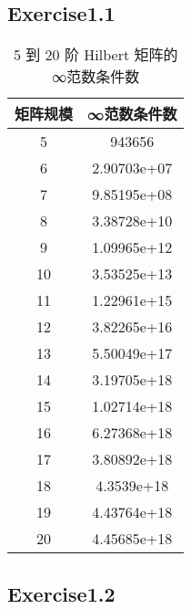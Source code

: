 \documentclass{article}
\begin{document}
\subsection*{Exercise1.1}


\begin{table}[htbp]
	\centering
	\begin{tabular}{cc}
		\toprule
		\textbf{矩阵规模} & \textbf{∞范数条件数} \\
		\midrule
		5             & 943656          \\
		6             & 2.90703e+07     \\
		7             & 9.85195e+08     \\
		8             & 3.38728e+10     \\
		9             & 1.09965e+12     \\
		10            & 3.53525e+13     \\
		11            & 1.22961e+15     \\
		12            & 3.82265e+16     \\
		13            & 5.50049e+17     \\
		14            & 3.19705e+18     \\
		15            & 1.02714e+18     \\
		16            & 6.27368e+18     \\
		17            & 3.80892e+18     \\
		18            & 4.3539e+18      \\
		19            & 4.43764e+18     \\
		20            & 4.45685e+18    \\
		\bottomrule
	\end{tabular}
	\caption{5 到 20 阶 Hilbert 矩阵的∞范数条件数}
	\label{tab:my-table}
\end{table}

\subsection*{Exercise1.2}
\end{document}
